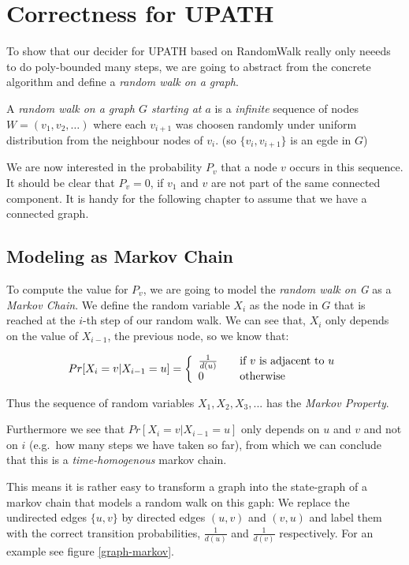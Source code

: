 \section{Correctness for UPATH}\label{correctness-for-upath}

To show that our decider for UPATH based on RandomWalk really only
neeeds to do poly-bounded many steps, we are going to abstract from the
concrete algorithm and define a \emph{random walk on a graph}.

A \emph{random walk on a graph $G$ starting at $a$} is a \emph{infinite}
sequence of nodes $W = (v_1, v_2, \dots)$ where each $v_{i+1}$ was
choosen randomly under uniform distribution from the neighbour nodes of
$v_i$. (so $\{v_i, v_{i+1}\}$ is an egde in $G$)

We are now interested in the probability $P_v$ that a node $v$ occurs in
this sequence. It should be clear that $P_v = 0$, if $v_1$ and $v$ are
not part of the same connected component. It is handy for the following
chapter to assume that we have a connected graph.

\subsection{Modeling as Markov Chain}\label{modeling-as-markov-chain}

To compute the value for $P_v$, we are going to model the \emph{random
walk on G} as a \emph{Markov Chain}. We define the random variable $X_i$
as the node in $G$ that is reached at the $i$-th step of our random
walk. We can see that, $X_i$ only depends on the value of $X_{i-1}$, the
previous node, so we know that:

\[ Pr[X_i = v | X_{i-1} = u] = \left\{
  \begin{array}{l l}
    \frac{1}{d(u)} & \quad \text{if $v$ is adjacent to $u$}\\
    0 & \quad \text{otherwise}
  \end{array} \right.
\]

Thus the sequence of random variables $X_1, X_2, X_3, ...$ has the
\emph{Markov Property}.

Furthermore we see that $Pr[X_i = v | X_{i-1} = u]$ only depends on $u$
and $v$ and not on $i$ (e.g.~how many steps we have taken so far), from
which we can conclude that this is a \emph{time-homogenous} markov
chain.

This means it is rather easy to transform a graph into the state-graph
of a markov chain that models a random walk on this gaph: We replace the
undirected edges $\{u, v\}$ by directed edges $(u, v)$ and $(v, u)$ and
label them with the correct transition probabilities, $\frac{1}{d(u)}$
and $\frac{1}{d(v)}$ respectively. For an example see figure
\ref{graph-markov}.

